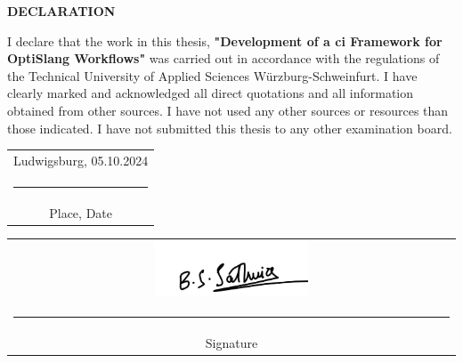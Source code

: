 \vspace*{3cm}
\begin{center}
    \textbf{\Huge DECLARATION}
\end{center}
\vspace{2cm}
\begin{onehalfspace}
    I declare that the work in this thesis, \textbf{"Development of a \acrlong{ci} Framework for OptiSlang Workflows"} was carried out in accordance
with the regulations of the Technical University of Applied Sciences Würzburg-Schweinfurt. I have clearly marked and acknowledged all direct quotations and all information obtained from other sources. I have not used any
other sources or resources than those indicated. I have not submitted this thesis to any other examination board.
\end{onehalfspace}

\vspace{1cm}

\vspace*{4em}\noindent
\hfill%
\begin{tabular}[t]{c}
  Ludwigsburg, 05.10.2024\\\rule{10em}{0.4pt}\\ Place, Date
\end{tabular}%
\hfill%
\begin{tabular}[t]{c}
\includegraphics[width=0.35\textwidth]{Images/signature.pdf}\\\rule{10em}{0.4pt}\\ Signature
\end{tabular}%
\hfill\strut